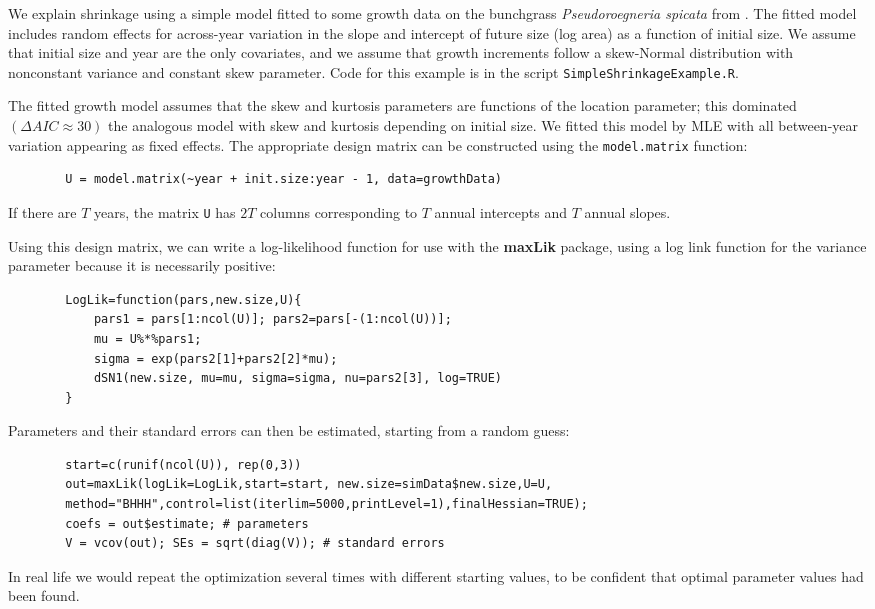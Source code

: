 \documentclass[12pt]{article}
\begin{document}
\begin{spacing}{1.35}
	We explain shrinkage using a simple model fitted to some growth data 
	on the bunchgrass \emph{Pseudoroegneria spicata} from \cite{adler-weak-dryad}. 
	The fitted model includes random effects for across-year variation in the slope and 
	intercept of future size (log area) as a function of initial size. We assume that initial size 
	and year are the only covariates, and we assume that growth increments 
	follow a skew-Normal distribution with nonconstant variance and constant skew parameter. 
	Code for this example is in the script \texttt{SimpleShrinkageExample.R}. 
	
	The fitted growth model assumes that the skew and kurtosis parameters are functions
	of the location parameter; this dominated $(\Delta AIC \approx 30)$ the analogous  
	model with skew and kurtosis depending on initial size.   
	We fitted this model by MLE with all between-year variation appearing as fixed effects. 
	The appropriate design matrix can be constructed using the \texttt{model.matrix} function: 
	\begin{lstlisting}
		U = model.matrix(~year + init.size:year - 1, data=growthData)
	\end{lstlisting}
	If there are $T$ years, the matrix \texttt{U} has $2T$ columns corresponding to $T$ annual 
	intercepts and $T$ annual slopes. 
	
	Using this design matrix, we can write a log-likelihood function for use with 
	the \textbf{maxLik} package, using a log link function for the variance parameter 
	because it is necessarily positive: 
	\begin{lstlisting}
		LogLik=function(pars,new.size,U){
			pars1 = pars[1:ncol(U)]; pars2=pars[-(1:ncol(U))];
			mu = U%*%pars1;  
			sigma = exp(pars2[1]+pars2[2]*mu);
			dSN1(new.size, mu=mu, sigma=sigma, nu=pars2[3], log=TRUE)
		}
	\end{lstlisting} 
	Parameters and their standard errors can then be estimated, starting from a random guess: 
	\begin{lstlisting}
		start=c(runif(ncol(U)), rep(0,3))
		out=maxLik(logLik=LogLik,start=start, new.size=simData$new.size,U=U,
		method="BHHH",control=list(iterlim=5000,printLevel=1),finalHessian=TRUE);
		coefs = out$estimate; # parameters
		V = vcov(out); SEs = sqrt(diag(V));	# standard errors 
	\end{lstlisting}  
	In real life we would repeat the optimization several times with different starting values, 
	to be confident that optimal parameter values had been found. 
	

\end{spacing}
\end{document}
